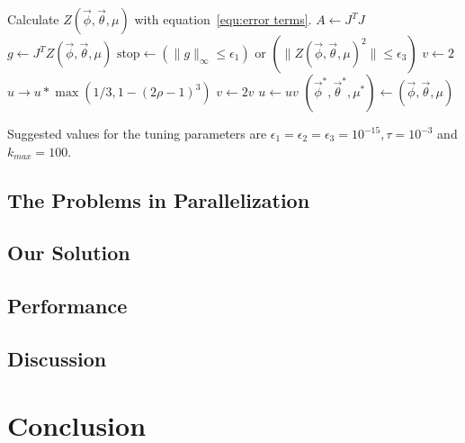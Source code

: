 \documentclass[english,12pt]{article}
\begin{document}
\begin{algorithm}[H]
\begin{algorithmic}[1]
                    \State Calculate $Z(\vec{\phi},\vec{\theta},\mu)$ with
                    equation~\ref{equ:error terms}.
					\State $A \leftarrow J^T J$
					\State $g \leftarrow J^T Z(\vec{\phi},\vec{\theta},\mu)$
					\State $ \text{stop} \leftarrow (\|g\|_{\infty} \le \epsilon_1)$ or $(\| Z(\vec{\phi},\vec{\theta},\mu)^2 \| \le \epsilon_3)$  
					\State $v \leftarrow 2$
					\State $u \rightarrow u * \max(1/3, 1 - (2\rho - 1)^3 )$
				\Else  {}
					\State $v \leftarrow 2 v$
					\State $u \leftarrow u v$
				\EndIf
			\EndIf
	\EndWhile
	\State $(\vec{\phi}^*,\vec{\theta}^*,\mu^*) \leftarrow (\vec{\phi},\vec{\theta},\mu)$
\end{algorithmic}
\label{alg:Levenberg-Marquardt}
\end{algorithm}

Suggested values for the tuning parameters are $\epsilon_1 = \epsilon_2 =
\epsilon_3 = 10^{-15}, \tau = 10^{-3}$ and $k_{max} = 100$.

\subsection{The Problems in Parallelization}


\subsection{Our Solution}


\subsection{Performance}


\subsection{Discussion}


\section{Conclusion}




\end{document}
